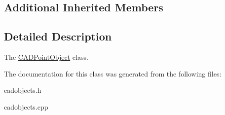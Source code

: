 \subsection*{Additional Inherited Members}


\subsection{Detailed Description}
The \hyperlink{class_c_a_d_point_object}{C\+A\+D\+Point\+Object} class. 

The documentation for this class was generated from the following files\+:\begin{DoxyCompactItemize}
\item 
cadobjects.\+h\item 
cadobjects.\+cpp\end{DoxyCompactItemize}
